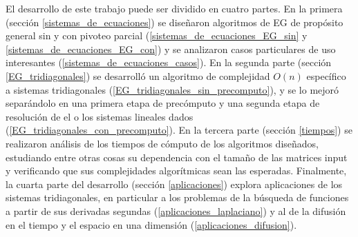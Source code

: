 El desarrollo de este trabajo puede ser dividido en cuatro partes. En la primera (sección \ref{sistemas_de_ecuaciones}) se diseñaron algoritmos de EG de propósito general sin y con pivoteo parcial (\ref{sistemas_de_ecuaciones_EG_sin} y \ref{sistemas_de_ecuaciones_EG_con}) y se analizaron casos particulares de uso interesantes (\ref{sistemas_de_ecuaciones_casos}). En la segunda parte (sección \ref{EG_tridiagonales}) se desarrolló un algoritmo de complejidad $O(n)$ específico a sistemas tridiagonales (\ref{EG_tridiagonales_sin_precomputo}), y se lo mejoró separándolo en una primera etapa de precómputo y una segunda etapa de resolución de el o los sistemas lineales dados (\ref{EG_tridiagonales_con_precomputo}). En la tercera parte (sección \ref{tiempos}) se realizaron análisis de los tiempos de cómputo de los algoritmos diseñados, estudiando entre otras cosas su dependencia con el tamaño de las matrices input y verificando que sus complejidades algorítmicas sean las esperadas. Finalmente, la cuarta parte del desarrollo (sección \ref{aplicaciones}) explora aplicaciones de los sistemas tridiagonales, en particular a los problemas de la búsqueda de funciones a partir de sus derivadas segundas (\ref{aplicaciones_laplaciano}) y al de la difusión en el tiempo y el espacio en una dimensión (\ref{aplicaciones_difusion}).